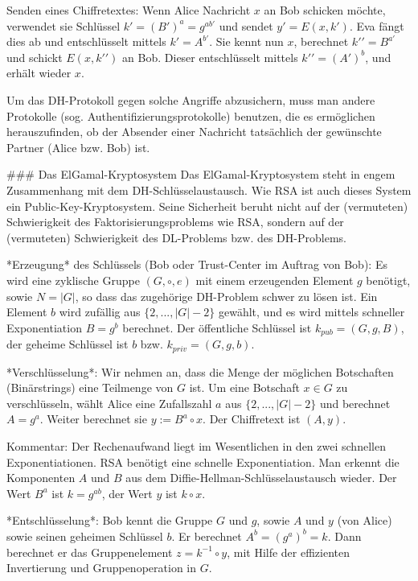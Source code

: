 \documentclass[a4paper]{article}
\begin{document}
\begin{multicols}{3}
{{{{        Senden eines Chiffretextes: Wenn Alice Nachricht $x$ an Bob schicken möchte, verwendet sie Schlüssel $k′= (B′)^a=g^{ab'}$ und sendet $y′=E(x,k′)$. Eva fängt dies ab und entschlüsselt mittels $k′=A^{b′}$. Sie kennt nun $x$, berechnet $k′′=B^{a′}$ und schickt $E(x,k′′)$ an Bob. Dieser entschlüsselt mittels $k′′= (A′)^b$, und erhält wieder $x$.

        Um das DH-Protokoll gegen solche Angriffe abzusichern, muss man andere Protokolle (sog. Authentifizierungsprotokolle) benutzen, die es ermöglichen herauszufinden, ob der Absender einer Nachricht tatsächlich der gewünschte Partner (Alice bzw. Bob) ist.

        ### Das ElGamal-Kryptosystem
        Das ElGamal-Kryptosystem steht in engem Zusammenhang mit dem DH-Schlüsselaustausch. Wie RSA ist auch dieses System ein Public-Key-Kryptosystem. Seine Sicherheit beruht nicht auf der (vermuteten) Schwierigkeit des Faktorisierungsproblems wie RSA, sondern auf der (vermuteten) Schwierigkeit des DL-Problems bzw. des DH-Problems.

        *Erzeugung* des Schlüssels (Bob oder Trust-Center im Auftrag von Bob): Es wird eine zyklische Gruppe $(G,\circ,e)$ mit einem erzeugenden Element $g$ benötigt, sowie $N=|G|$, so dass das zugehörige DH-Problem schwer zu lösen ist. Ein Element $b$ wird zufällig aus $\{2 ,...,|G|-2\}$ gewählt, und es wird mittels schneller Exponentiation $B=g^b$ berechnet. Der öffentliche Schlüssel ist $k_{pub}= (G,g,B)$, der geheime Schlüssel ist $b$ bzw. $k_{priv}=(G,g,b)$.

        *Verschlüsselung*: Wir nehmen an, dass die Menge der möglichen Botschaften (Binärstrings) eine Teilmenge von $G$ ist. Um eine Botschaft $x\in G$ zu verschlüsseln, wählt Alice eine Zufallszahl $a$ aus $\{2,...,|G|-2\}$ und berechnet $A=g^a$. Weiter berechnet sie $y:=B^a \circ x$. Der Chiffretext ist $(A,y)$.

        Kommentar: Der Rechenaufwand liegt im Wesentlichen in den zwei schnellen Exponentiationen. RSA benötigt eine schnelle Exponentiation. Man erkennt die Komponenten $A$ und $B$ aus dem Diffie-Hellman-Schlüsselaustausch wieder. Der Wert $B^a$ ist $k=g^{ab}$, der Wert $y$ ist $k\circ x$.

        *Entschlüsselung*: Bob kennt die Gruppe $G$ und $g$, sowie $A$ und $y$ (von Alice) sowie seinen geheimen Schlüssel $b$. Er berechnet $A^b= (g^a)^b=k$. Dann berechnet er das Gruppenelement $z=k^{-1}\circ y$, mit Hilfe der effizienten Invertierung und Gruppenoperation in $G$.

}}}}
\end{multicols}
\end{document}
